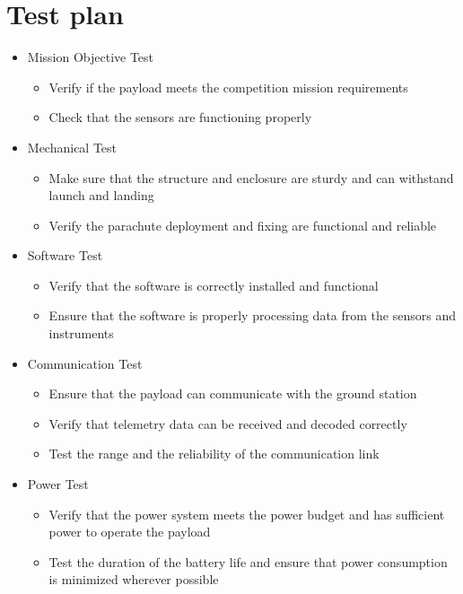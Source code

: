 \documentclass[11pt]{article}
\begin{document}
\section{Test plan}\label{A1}

\begin{itemize}[leftmargin=1cm, itemindent=0.25cm, noitemsep, topsep=0pt, label=]
\item Mission Objective Test
\begin{itemize}[label=, noitemsep, topsep=2pt]
\item Verify if the payload meets the competition mission requirements
\item Check that the sensors are functioning properly
\end{itemize}

\item Mechanical Test
\begin{itemize}[label=, noitemsep, topsep=2pt]
\item Make sure that the structure and enclosure are sturdy and can withstand launch and landing
\item Verify the parachute deployment and fixing are functional and reliable
\end{itemize}

\item Software Test
\begin{itemize}[label=, noitemsep, topsep=2pt]
\item Verify that the software is correctly installed and functional
\item Ensure that the software is properly processing data from the sensors and instruments
\end{itemize}

\item Communication Test
\begin{itemize}[label=, noitemsep, topsep=2pt]
\item Ensure that the payload can communicate with the ground station
\item Verify that telemetry data can be received and decoded correctly
\item Test the range and the reliability of the communication link
\end{itemize}

\item Power Test
\begin{itemize}[label=, noitemsep, topsep=2pt]
\item Verify that the power system meets the power budget and has sufficient power to operate the payload
\item Test the duration of the battery life and ensure that power consumption is minimized wherever possible
\end{itemize}


\end{itemize}
\end{document}
